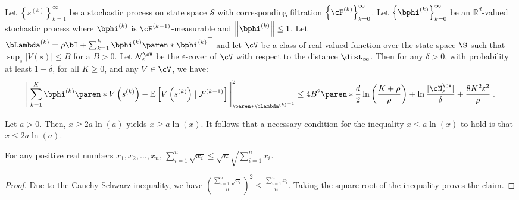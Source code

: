 \begin{lemma}\label{lemma:fixed-V-bound}
Let $\left\{s^{(k)}\right\}_{k=1}^{\infty}$ be a stochastic process on state space $\mathcal{S}$ with corresponding filtration $\left\{\cF^{(k)}\right\}_{k=0}^{\infty}$.
Let $\left\{\bphi^{(k)}\right\}_{k=0}^{\infty}$ be an $\mathbb{R}^d$-valued stochastic process where $\bphi^{(k)}$ is $\cF^{(k-1)}$-measurable and $\left\|\bphi^{(k)}\right\| \leq 1$.
Let $\bLambda^{(k)}=\rho \bI+\sum_{k=1}^k \bphi^{(k)} \paren*{\bphi^{(k)}}^{\top}$ and let $\cV$ be a class of real-valued function over the state space $\S$ such that $\sup_s|V(s)| \leq B$ for a $B > 0$.
Let $\mathcal{N}^\cV_{\varepsilon}$ be the $\varepsilon$-cover of $\cV$ with respect to the distance $\dist_\infty$. 
Then for any $\delta>0$, with probability at least $1-\delta$, for all $K \geq 0$, and any $V \in \cV$, we have:    
$$
\left\|\sum_{k=1}^K \bphi^{(k)}\paren*{V\left(s^{(k)}\right)-\mathbb{E}\left[V\left(s^{(k)}\right) \mid \mathcal{F}^{(k-1)}\right]}\right\|_{\paren*{\bLambda^{(k)}}^{-1}}^2 \leq 4 B^2\paren*{\frac{d}{2} \ln \left(\frac{K+\rho}{\rho}\right)+\ln \frac{|\cN^\cV_{\varepsilon}|}{\delta}}+\frac{8 K^2 \varepsilon^2}{\rho}\;.
$$
\end{lemma}




\begin{lemma}\label{lemma:alogx-inequality}
Let $a>0$. Then, $x \geq 2 a \ln (a)$ yields $x \geq a \ln (x)$. 
It follows that a necessary condition for the inequality $x\leq a \ln (x)$ to hold is that $x\leq 2 a \ln (a)$.    
\end{lemma}

\begin{lemma}\label{lemma:sum of sqrt}
For any positive real numbers $x_1, x_2, \dots, x_n$, 
$\sum_{i=1}^n \sqrt{x_i} \leq \sqrt{n}\sqrt{\sum^n_{i=1}x_i}$.
\end{lemma}
\begin{proof}
Due to the Cauchy-Schwarz inequality, we have
$
\left(\frac{\sum_{i=1}^n \sqrt{x_i}}{n}\right)^2 \leq \frac{\sum_{i=1}^n x_i}{n}
$.
Taking the square root of the inequality proves the claim.
\end{proof}

